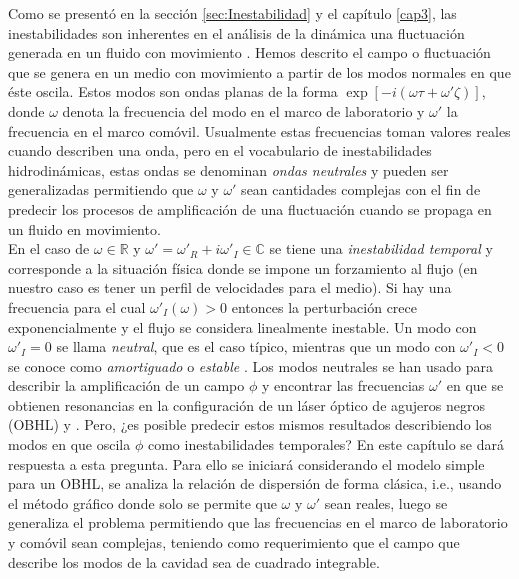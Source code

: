 Como se present\'{o} en la secci\'{o}n \ref{sec:Inestabilidad} y el cap\'{i}tulo \ref{cap3}, las inestabilidades son inherentes en el an\'{a}lisis de la din\'{a}mica una fluctuaci\'{o}n generada en un fluido con movimiento \citep{Hydrodynamic}. Hemos descrito el campo o fluctuaci\'{o}n que se genera en un medio con movimiento a partir de los modos normales en que \'{e}ste oscila. Estos modos son ondas planas de la forma $\exp[-i(\omega \tau+\omega' \zeta)]$, donde $\omega$ denota la frecuencia del modo en el marco de laboratorio y $\omega'$ la frecuencia en el marco com\'{o}vil. Usualmente estas frecuencias toman valores reales cuando describen una onda, pero en el vocabulario de inestabilidades hidrodinámicas, estas ondas se denominan\textit{ ondas neutrales} y pueden ser generalizadas permitiendo que $\omega$ y $\omega'$ sean cantidades complejas con el fin de predecir los procesos de amplificaci\'{o}n de una fluctuaci\'{o}n cuando se propaga en un fluido en movimiento.\\

En el caso de $\omega \in \mathbb{R}$  y $\omega'=\omega'_R+i\omega'_I \in \mathbb{C}$ se tiene una \textit{inestabilidad temporal} y corresponde a la situación física donde se impone un forzamiento al flujo (en nuestro caso es tener un perfil de velocidades para el medio). Si hay una frecuencia para el cual $\omega'_I(\omega)>0$  entonces la perturbación crece exponencialmente y el flujo se considera linealmente inestable. Un modo con $\omega'_I=0$ se llama \textit{neutral}, que es el caso t\'{i}pico, mientras que un modo con $\omega'_I<0$ se conoce como\textit{ amortiguado} o\textit{ estable} \citep{gallaire2017fluid}. Los modos neutrales se han usado para describir la amplificaci\'{o}n de un campo $\phi$ y encontrar las frecuencias $\omega'$ en que se obtienen resonancias en la configuraci\'{o}n de un l\'{a}ser \'{o}ptico de agujeros negros (OBHL) \citep{Faccio2012} y \citep{GaonaReyes2017}. Pero, ¿es posible predecir estos mismos resultados describiendo los modos en que oscila $\phi$ como inestabilidades temporales? En este cap\'{i}tulo se dar\'{a} respuesta a esta pregunta. Para ello se iniciar\'{a} considerando el modelo simple para un OBHL, se analiza la relaci\'{o}n de dispersi\'{o}n de forma cl\'{a}sica, i.e., usando el m\'{e}todo gr\'{a}fico donde solo se permite que $\omega$ y $\omega'$ sean reales, luego se generaliza el problema permitiendo que las frecuencias en el marco de laboratorio y com\'{o}vil sean complejas, teniendo como requerimiento que el campo que describe los modos de la cavidad sea de cuadrado integrable.\\

